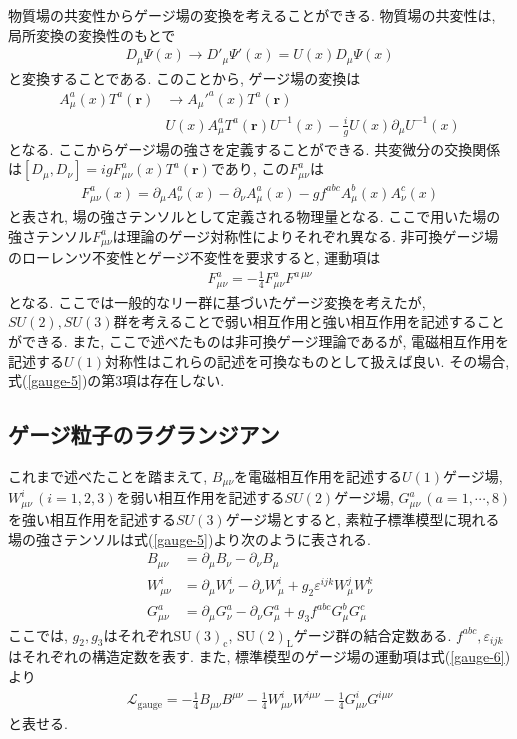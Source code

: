 \documentclass[uplatex,dvipdfmx,a4paper,titlepage]{jsbook}
\theoremstyle{plain}
\theoremstyle{definition}
\begin{document}
物質場の共変性からゲージ場の変換を考えることができる.
物質場の共変性は, 局所変換の変換性のもとで
\begin{align}
  D_\mu\Psi(x) \rightarrow D'_\mu \Psi'(x) = U(x) D_\mu \Psi(x)\label{gauge-3}
\end{align}
と変換することである.
このことから, ゲージ場の変換は
\begin{align}
   A_\mu^a(x) T^a(\bm{r}) &\rightarrow A_\mu'^a(x) T^a(\bm{r})\nonumber\\
                          & U(x)A_\mu^a T^a(\bm{r}) U^{-1}(x) -\frac{i}{g}U(x)\partial_\mu U^{-1}(x) \label{gauge-4}
\end{align}
となる.
ここからゲージ場の強さを定義することができる.
共変微分の交換関係は$[D_\mu,D_\nu] = igF_{\mu\nu}^a(x)T^a(\bm{r})$であり, この$F_{\mu\nu}^a$は
\begin{align}
  F_{\mu\nu}^a(x) = \partial_\mu A_\nu^a(x) - \partial_\nu A_\mu^a(x) - gf^{abc}A_\mu^b(x)A_\nu^c(x)\label{gauge-5}
\end{align}
と表され, 場の強さテンソルとして定義される物理量となる.
ここで用いた場の強さテンソル$F_{\mu\nu}^a$は理論のゲージ対称性によりそれぞれ異なる.
非可換ゲージ場のローレンツ不変性とゲージ不変性を要求すると, 運動項は
\begin{align}
  F_{\mu\nu}^a = -\frac{1}{4}F_{\mu\nu}^a F^{a\,\mu\nu}\label{gauge-6}
\end{align}
となる.
ここでは一般的なリー群に基づいたゲージ変換を考えたが, $SU(2), SU(3)$群を考えることで弱い相互作用と強い相互作用を記述することができる.
また, ここで述べたものは非可換ゲージ理論であるが, 電磁相互作用を記述する$U(1)$対称性はこれらの記述を可換なものとして扱えば良い.
その場合, 式(\ref{gauge-5})の第3項は存在しない.
\subsection{ゲージ粒子のラグランジアン}
これまで述べたことを踏まえて, $B_{\mu\nu}$を電磁相互作用を記述する$U(1)$ゲージ場, $W_{\mu\nu}^i\,(i=1,2,3)$を弱い相互作用を記述する$SU(2)$ゲージ場, $G_{\mu\nu}^a\,(a=1,\cdots,8)$を強い相互作用を記述する$SU(3)$ゲージ場とすると, 素粒子標準模型に現れる場の強さテンソルは式(\ref{gauge-5})より次のように表される.
\begin{align}
  B_{\mu\nu} &= \partial_\mu B_\nu - \partial_\nu B_\mu \label{gauge.B}\\
  W_{\mu\nu}^i &= \partial_\mu W_\nu^i - \partial_\nu W_\mu^i+g_2\varepsilon^{ijk}W_\mu^j W_\nu^k \label{gauge.W}\\
  G_{\mu\nu}^a &= \partial_\mu G_\nu^a - \partial_\nu G_\mu^a +g_3 f^{abc}G_\mu^b G_\mu^c\label{gauge.G}
\end{align}
ここでは, $g_2, g_3$はそれぞれ$\mathrm{SU}(3)_\mathrm{c}$, $\mathrm{SU}(2)_\mathrm{L}$ゲージ群の結合定数ある.
$f^{abc}, \varepsilon_{ijk} $はそれぞれの構造定数を表す.
また, 標準模型のゲージ場の運動項は式(\ref{gauge-6})より
\begin{align}
  \mathcal{L}_{\text{gauge}} = -\frac{1}{4}B_{\mu\nu} B^{\mu\nu} - \frac{1}{4}W_{\mu\nu}^i W^{i\mu\nu} -\frac{1}{4}G_{\mu\nu}^i G^{i\mu\nu}\label{gauge.kin}
\end{align}
と表せる.
\end{document}

